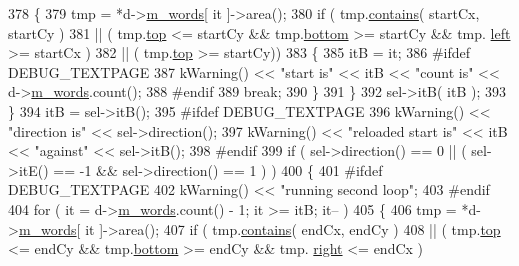 \begin{DoxyCode}
378         \{
379             tmp = *d->\hyperlink{classOkular_1_1TextPagePrivate_a36b703334a8775136cb4308209afd1cb}{m\_words}[ it ]->area();
380             \textcolor{keywordflow}{if} ( tmp.\hyperlink{classOkular_1_1NormalizedRect_ad9373aab8c5c6369cb0a9cbed2749d9b}{contains}( startCx, startCy )
381                  || ( tmp.\hyperlink{classOkular_1_1NormalizedRect_acfb70f6417c993508d50090b512cb954}{top} <= startCy && tmp.\hyperlink{classOkular_1_1NormalizedRect_a06fddfff238371f6f584360c0678741a}{bottom} >= startCy && tmp.
      \hyperlink{classOkular_1_1NormalizedRect_a76336fe9d733f2b559cf8df3ef48f9e7}{left} >= startCx )
382                  || ( tmp.\hyperlink{classOkular_1_1NormalizedRect_acfb70f6417c993508d50090b512cb954}{top} >= startCy))
383             \{
385                 itB = it;
386 \textcolor{preprocessor}{#ifdef DEBUG\_TEXTPAGE}
387                 kWarning() << \textcolor{stringliteral}{"start is"} << itB << \textcolor{stringliteral}{"count is"} << d->\hyperlink{classOkular_1_1TextPagePrivate_a36b703334a8775136cb4308209afd1cb}{m\_words}.count();
388 \textcolor{preprocessor}{#endif}
389                 \textcolor{keywordflow}{break};
390             \}
391         \}
392         sel->itB( itB );
393     \}
394     itB = sel->itB();
395 \textcolor{preprocessor}{#ifdef DEBUG\_TEXTPAGE}
396     kWarning() << \textcolor{stringliteral}{"direction is"} << sel->direction();
397     kWarning() << \textcolor{stringliteral}{"reloaded start is"} << itB << \textcolor{stringliteral}{"against"} << sel->itB();
398 \textcolor{preprocessor}{#endif}
399     \textcolor{keywordflow}{if} ( sel->direction() == 0 || ( sel->itE() == -1 && sel->direction() == 1 ) )
400     \{
401 \textcolor{preprocessor}{#ifdef DEBUG\_TEXTPAGE}
402         kWarning() << \textcolor{stringliteral}{"running second loop"};
403 \textcolor{preprocessor}{#endif}
404         \textcolor{keywordflow}{for} ( it = d->\hyperlink{classOkular_1_1TextPagePrivate_a36b703334a8775136cb4308209afd1cb}{m\_words}.count() - 1; it >= itB; it-- )
405         \{
406             tmp = *d->\hyperlink{classOkular_1_1TextPagePrivate_a36b703334a8775136cb4308209afd1cb}{m\_words}[ it ]->area();
407             \textcolor{keywordflow}{if} ( tmp.\hyperlink{classOkular_1_1NormalizedRect_ad9373aab8c5c6369cb0a9cbed2749d9b}{contains}( endCx, endCy )
408                  || ( tmp.\hyperlink{classOkular_1_1NormalizedRect_acfb70f6417c993508d50090b512cb954}{top} <= endCy && tmp.\hyperlink{classOkular_1_1NormalizedRect_a06fddfff238371f6f584360c0678741a}{bottom} >= endCy && tmp.
      \hyperlink{classOkular_1_1NormalizedRect_a12bbdbb865e6282c9a325b61638553f4}{right} <= endCx )

\end{DoxyCode}
